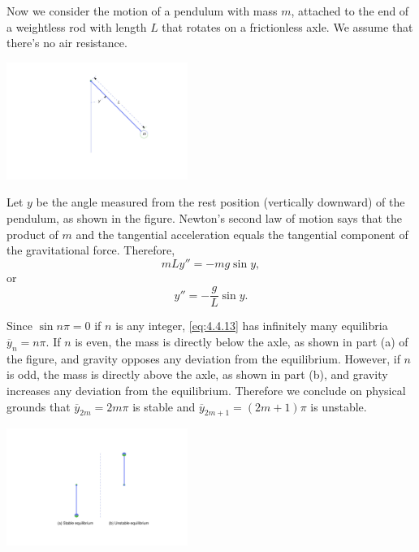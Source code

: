 \documentclass{ximera}
\begin{document}
\begin{example}\label{example:4.4.2}
Now we
consider the motion of a pendulum with mass $m$, attached to the end
of a weightless rod with length $L$ that rotates on a frictionless
axle. We assume that there's no air
resistance.

\begin{image}
 \includegraphics[height=1.5in]{fig040405.jpg} 
\end{image}


Let $y$ be the angle measured from the rest position
(vertically downward) of the pendulum, as shown in
the figure. Newton's second law of motion says that the
product of $m$ and the tangential acceleration equals the tangential
component of the gravitational force.  Therefore,
$$
mLy''=-mg\sin y,
$$
or
\begin{equation} \label{eq:4.4.13}
y''=-\frac{g}{L} \sin y.
\end{equation}


Since $\sin n\pi=0$ if $n$ is any integer,  \eqref{eq:4.4.13} has
infinitely many equilibria $\overline{y}_n=n\pi$. If $n$ is
even, the mass is directly below the axle, as shown in part (a) of the figure, and gravity opposes any deviation
from the equilibrium. However, if $n$ is odd, the mass is directly
above the axle, as shown in part (b), and gravity
increases any deviation from the equilibrium. Therefore we conclude
on physical grounds that $\overline{y}_{2m}=2m\pi$ is stable and
$\overline{y}_{2m+1}=(2m+1)\pi$ is unstable.


\begin{image}
 \includegraphics[height=1.5in]{fig040406.jpg} 
\end{image}



\end{example}
\end{document}
